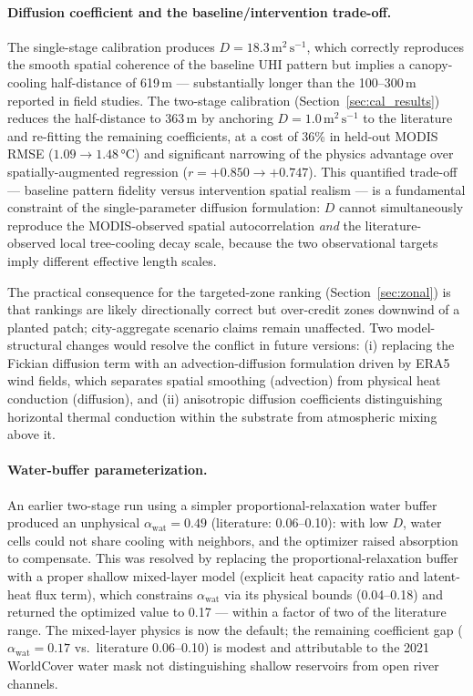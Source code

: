 \documentclass[12pt, letterpaper]{article}
\begin{document}
\paragraph{Diffusion coefficient and the baseline/intervention trade-off.}
\label{par:diffusion}
The single-stage calibration produces $D = 18.3\,\text{m}^2\,\text{s}^{-1}$,
which correctly reproduces the smooth spatial coherence of the baseline UHI
pattern but implies a canopy-cooling half-distance of 619\,m — substantially
longer than the 100--300\,m reported in field studies. The two-stage
calibration (Section~\ref{sec:cal_results}) reduces the half-distance to
363\,m by anchoring $D = 1.0\,\text{m}^2\,\text{s}^{-1}$ to the literature
and re-fitting the remaining coefficients, at a cost of 36\% in held-out MODIS
RMSE ($1.09 \to 1.48$\,°C) and significant narrowing of the physics advantage
over spatially-augmented regression ($r = +0.850 \to +0.747$). This quantified trade-off — baseline pattern
fidelity versus intervention spatial realism — is a fundamental constraint
of the single-parameter diffusion formulation: $D$ cannot simultaneously
reproduce the MODIS-observed spatial autocorrelation \emph{and} the
literature-observed local tree-cooling decay scale, because the two
observational targets imply different effective length scales.

The practical consequence for the targeted-zone ranking
(Section~\ref{sec:zonal}) is that rankings are likely directionally correct
but over-credit zones downwind of a planted patch; city-aggregate scenario
claims remain unaffected. Two model-structural changes would resolve the
conflict in future versions: (i) replacing the Fickian diffusion term with
an advection-diffusion formulation driven by ERA5 wind fields, which separates
spatial smoothing (advection) from physical heat conduction (diffusion), and
(ii) anisotropic diffusion coefficients distinguishing horizontal thermal
conduction within the substrate from atmospheric mixing above it.

\paragraph{Water-buffer parameterization.}
An earlier two-stage run using a simpler proportional-relaxation water
buffer produced an unphysical $\alpha_{\mathrm{wat}} = 0.49$ (literature:
0.06--0.10): with low $D$, water cells could not share cooling with
neighbors, and the optimizer raised absorption to compensate. This was
resolved by replacing the proportional-relaxation buffer with a proper
shallow mixed-layer model (explicit heat capacity ratio and latent-heat
flux term), which constrains $\alpha_{\mathrm{wat}}$ via its physical
bounds (0.04--0.18) and returned the optimized value to 0.17 —
within a factor of two of the literature range. The mixed-layer physics
is now the default; the remaining coefficient gap ($\alpha_{\mathrm{wat}}
= 0.17$ vs.\ literature 0.06--0.10) is modest and attributable to the
2021 WorldCover water mask not distinguishing shallow reservoirs from
open river channels.
\end{document}
